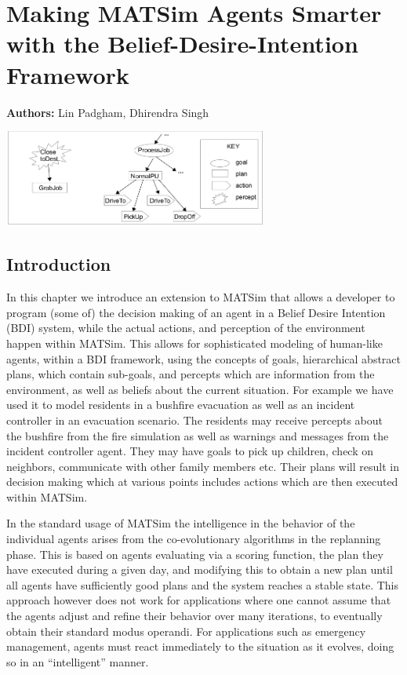 \chapter{Making MATSim Agents Smarter with the Belief-Desire-Intention Framework}
\label{ch:bdi}

\hfill \textbf{Authors:} Lin Padgham, Dhirendra Singh

\begin{center} \includegraphics[width=0.65\textwidth, angle=0]{extending/figures/bdi/fig-taxi-gptree.jpg} \end{center}

\section{Introduction}
\label{sec:bdi-intro}
In this chapter we introduce an extension to MATSim that allows a
developer to program (some of) the decision making of an agent in a
Belief Desire Intention (BDI) system, while the actual actions, and
perception of the environment happen within MATSim. This allows for
sophisticated modeling of human-like agents, within a BDI
framework, using the concepts of goals, hierarchical abstract plans,
which contain sub-goals, and percepts which are information from the
environment, as well as beliefs about the current situation. For
example we have used it to model residents in a 
bushfire evacuation as well as an incident controller in an evacuation
scenario. The residents may receive percepts about the bushfire from
the fire simulation as well as warnings and messages from the incident
controller agent. They may
have goals to pick up children, check on neighbors, communicate with
other family members etc. Their plans will result in
decision making which at various points includes actions which are then
executed within MATSim.

In the standard usage of MATSim the intelligence in the behavior of
the individual agents arises from the  co-evolutionary algorithms in
the replanning phase. This is based on agents evaluating via a scoring
function, the plan they have executed during a given day, and
modifying this to obtain a new plan until all agents have sufficiently good
plans and the system reaches a stable state. This approach however
does not work for applications where one cannot assume that the agents
adjust and refine their behavior over many iterations, to eventually
obtain their standard modus operandi. For applications such as
emergency management, agents must react immediately to the situation
as it evolves, doing so in an ``intelligent'' manner. 

